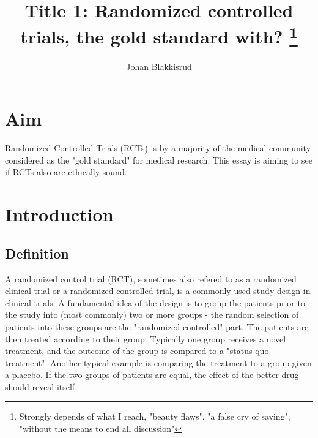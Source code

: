 \documentclass[12p]{article}
\title{Title 1: Randomized controlled trials, the gold standard with?
  \footnote{Strongly depends of what I reach, "beauty flaws", "a false cry of saving", "without the means to end all discussion"}
}
\author{Johan Blakkisrud}
\begin{document}
\maketitle

\section*{Aim}

Randomized Controlled Trials (RCTs) is by a majority of the medical community considered as the "gold standard" for medical research.
This essay is aiming to see if RCTs also are ethically sound.

\section*{Introduction}

\subsection*{Definition}

A randomized control trial (RCT), sometimes also refered to as a randomized clinical trial or a randomized controlled trial, is a commonly used study design in clinical trials.
A fundamental idea of the design is to group the patients prior to the study into (most commonly) two or more groups - the random selection of patients into these groups are the "randomized controlled" part.
The patients are then treated according to their group.
Typically one group receives a novel treatment, and the outcome of the group is compared to a "status quo treatment".
Another typical example is comparing the treatment to a group given a placebo. 
If the two groups of patients are equal, the effect of the better drug should reveal itself.
\end{document}
